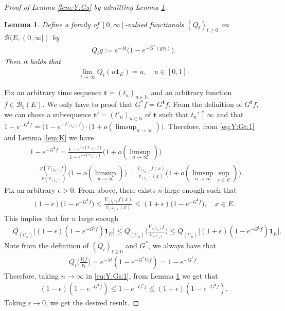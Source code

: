 \documentclass[12pt,a4paper]{amsart}
\numberwithin{equation}{section}
\theoremstyle{plain}
\newtheorem{lem}[thm]{Lemma}
\theoremstyle{definition}
\begin{document}
\begin{proof}[Proof of Lemma \ref{lem:Y:Gs} by admitting Lemma \ref{lem:Y:Gs:Q}]
\begin{lem}
  \label{lem:Y:Gs:Q}
Define a family of $[0,\infty]$-valued functionals $(Q_t)_{t\geq 0}$ on $\mathcal B(E,(0,\infty])$ by
\begin{align}
	Q_tg 
  := e^{- \lambda t}\big( 1 - e^{-G^*(gv_t)} \big).
\end{align}
Then it holds that
\begin{align}
	\lim_{t\to \infty} Q_t(u \mathbf 1_E) 
  = u,
  \quad u \in [0,1].
\end{align}
\end{lem}

Fix an arbitrary time sequence $\mathbf t=(t_n)_{n\in \mathbb N}$ and an arbitrary function $f\in \mathcal B_b(E)$.
We only have to proof that $G^* f = G^{\mathbf t}f$.
From the definition of $G^{\mathbf t}f$, we can chose a subsequence $\mathbf t'=(t'_n)_{n \in \mathbb N}$ of $\mathbf t$ such that $t_n'\uparrow \infty$ and that  $ 1 - e^{- G^{\mathbf t}f} =  \big( 1 - e^{-\Gamma_{( t_n')} f} \big) \cdot \big(1+ o(\limsup_{n \to \infty}  )\big). $
Therefore, from \eqref{eq:Y:Gt:1} and  Lemma \ref{lem:K} we have
\begin{align}
  & 1 - e^{- G^{\mathbf t}f}
  = \frac{1 - e^{- \nu( V_{(t_n')}f)}}{1- e^{- \nu(v_{(t_n')})}}  \big(1+o(\limsup_{n\to \infty})\big) \\
  & = \frac{\nu (V_{(t_n')} f)}{\nu(v_{(t_n')})}\big(1+o(\limsup_{n\to \infty})\big) 
  =  \frac{V_{(t_n')}f(x)}{v_{(t_n')}(x)} \big( 1 + o(\limsup_{n \to \infty} \sup_{x\in E})\big).
\end{align}
Fix an arbitrary $\epsilon > 0$. 
From above, there exists $n$ large enough such that
\begin{align}
  (1-\epsilon) \big(1 - e^{- G^{\mathbf t}f} \big)
  \leq \frac{V_{(t_n')}f(x)}{v_{(t'_n)}(x)}
  \leq (1+\epsilon) \big( 1 - e^{- G^{\mathbf t}f} \big),
  \quad x\in E.
\end{align}
This implies that for $n$ large enough 
\begin{align}
  \label{eq:Y:Gs:1}
  & Q_{(t'_n)}\big[ (1-\epsilon) (1-e^{-G^{\mathbf t}f})\mathbf 1_E \big]
    \leq Q_{(t'_n)}\Big( \frac{V_{(t'_n)}f}{v_{(t'_n)}} \Big) 
    \leq Q_{(t'_n)}\big[  (1+\epsilon) (1-e^{-G^{\mathbf t}f}) \mathbf 1_E \big].
\end{align}
Note from the definition of $(Q_t)_{t\geq 0}$ and $G^*$, we always have that
\begin{align}
	Q_t\Big ( \frac{V_tf}{v_t} \Big ) 
  = e^{- \lambda t}( 1 - e^{- G^*V_tf}  )
  = 1- e^{- G^* f}.
\end{align}	
Therefore, taking $n \to \infty$ in \eqref{eq:Y:Gs:1}, from Lemma \ref{lem:Y:Gs:Q} we get that
\begin{align}
	(1 - \epsilon) (1 - e^{- G^{\mathbf t}f})
  \leq 1 - e^{- G^* f} 
  \leq (1 + \epsilon) (1 - e^{- G^{\mathbf t} f}).
\end{align}
Taking $\epsilon \to 0$, we get the desired result.
\end{proof}
\end{document}
